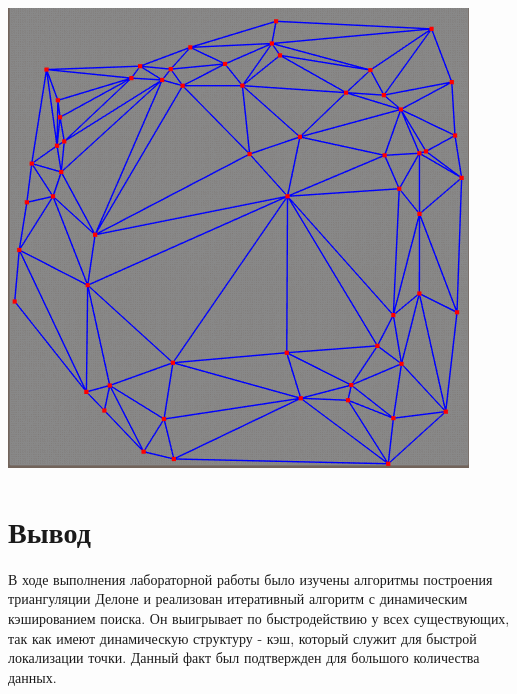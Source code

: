 \documentclass[a4paper, 12pt]{article}   	%
\begin{document}
\begin{center}
\begin{minipage}{0.47\linewidth}
        \end{minipage}
        \begin{minipage}{0.47\linewidth}
            \includegraphics[width=\linewidth]{img/triang_59}
        \end{minipage}
    \end{center}

\newpage
\section{Вывод}
    В ходе выполнения лабораторной работы было изучены алгоритмы построения триангуляции Делоне и реализован итеративный алгоритм с динамическим кэшированием поиска. Он выигрывает по быстродействию у всех существующих, так как имеют динамическую структуру - кэш, который служит для быстрой локализации точки. Данный факт был подтвержден для большого количества данных.

\newpage

 
\end{document}
